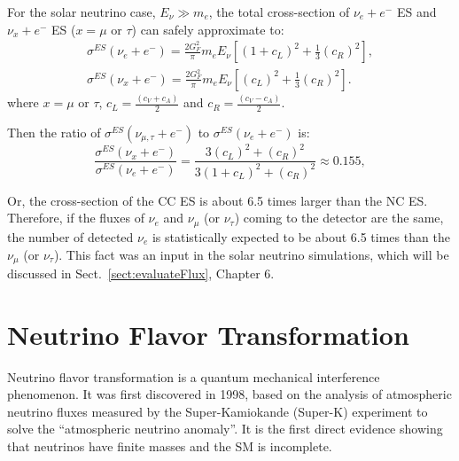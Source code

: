 For the solar neutrino case, $E_\nu\gg m_e$, the total cross-section of $\nu_e+e^-$ ES and $\nu_x+e^-$ ES ($x=\mu$ or $\tau$) can safely approximate to\cite{xing2011neutrinos}:
\begin{equation}
\begin{aligned}
\sigma^{ES}(\nu_e+e^-) = \frac{2G_F^2}{\pi}m_e E_\nu \left[(1+c_L)^2+\frac{1}{3}(c_R)^2\right],\\
\sigma^{ES}(\nu_x+e^-) = \frac{2G_F^2}{\pi}m_e E_\nu \left[(c_L)^2+\frac{1}{3}(c_R)^2\right].
\end{aligned}
\end{equation}
where $x=\mu$ or $\tau$, $c_L=\frac{(c_V+c_A)}{2}$ and $c_R = \frac{(c_V-c_A)}{2}$.

Then the ratio of $\sigma^{ES}(\nu_{\mu,\tau}+e^-)$ to $\sigma^{ES}(\nu_e+e^-)$ is\cite{xing2011neutrinos}:
\begin{equation}
\frac{\sigma^{ES}(\nu_{x}+e^-)}{\sigma^{ES}(\nu_e+e^-)} = \frac{3(c_L)^2+({c_R})^2}{3(1+c_L)^2+(c_R)^2} \approx 0.155,
\end{equation}

Or, the cross-section of the CC ES is about 6.5 times larger than the NC ES. Therefore, if the fluxes of $\nu_e$ and $\nu_{\mu}$ (or $\nu_\tau$) coming to the detector are the same, the number of detected $\nu_e$ is statistically expected to be about 6.5 times than the $\nu_{\mu}$ (or $\nu_\tau$). This fact was an input in the solar neutrino simulations, which will be discussed in Sect.~\ref{sect:evaluateFlux}, Chapter 6. 


\section{Neutrino Flavor Transformation}
Neutrino flavor transformation is a quantum mechanical interference phenomenon\cite{akhmedov2019quantum}. It was first discovered in 1998, based on the analysis of atmospheric neutrino fluxes measured by the Super-Kamiokande (Super-K) experiment to solve the ``atmospheric neutrino anomaly''\cite{fukuda1998evidence}. It is the first direct evidence showing that neutrinos have finite masses and the SM is incomplete.

